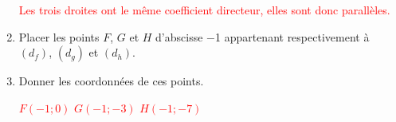 \begin{corrige}
\begin{enumerate}
        \textcolor{red}{Les trois droites ont le même coefficient directeur, elles sont donc parallèles.}
        \item Placer les points $F$, $G$ et $H$ d'abscisse \num{-1} appartenant respectivement à $(d_f)$, $(d_g)$ et $(d_h)$.
        \item Donner les coordonnées de ces points.
        
        \textcolor{red}{$F(-1;0)$ $G(-1;-3)$ $H(-1;-7)$}
    \end{enumerate}
\end{corrige}
